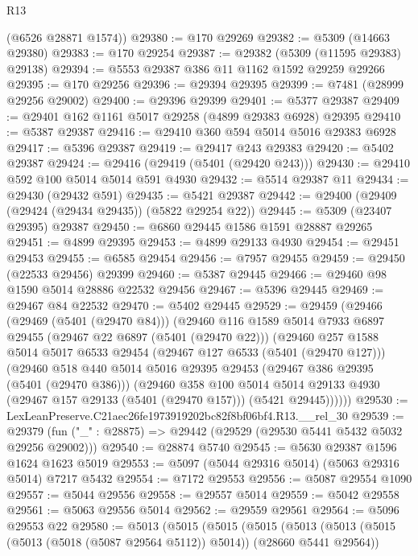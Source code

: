 \begin{lexlean}{R13}
\begin{coremodule}
      (@6526 @28871 @1574))
@29380 := @170 @29269
@29382 := @5309 (@14663 @29380)
@29383 := @170 @29254
@29387 := @29382 (@5309 (@11595 @29383) @29138)
@29394 := @5553 @29387 @386 @11 @1162 @1592 @29259 @29266
@29395 := @170 @29256
@29396 := @29394 @29395
@29399 := @7481 (@28999 @29256 @29002)
@29400 := @29396 @29399
@29401 := @5377 @29387
@29409 := @29401 @162 @1161 @5017 @29258 (@4899 @29383 @6928) @29395
@29410 := @5387 @29387
@29416 := @29410 @360 @594 @5014 @5016 @29383 @6928
@29417 := @5396 @29387
@29419 := @29417 @243 @29383
@29420 := @5402 @29387
@29424 := @29416 (@29419 (@5401 (@29420 @243)))
@29430 := @29410 @592 @100 @5014 @5014 @591 @4930
@29432 := @5514 @29387 @11
@29434 := @29430 (@29432 @591)
@29435 := @5421 @29387
@29442 := @29400 (@29409 (@29424 (@29434 @29435)) (@5822 @29254 @22))
@29445 := @5309 (@23407 @29395) @29387
@29450 := @6860 @29445 @1586 @1591 @28887 @29265
@29451 := @4899 @29395
@29453 := @4899 @29133 @4930
@29454 := @29451 @29453
@29455 := @6585 @29454
@29456 := @7957 @29455
@29459 := @29450 (@22533 @29456) @29399
@29460 := @5387 @29445
@29466 := @29460 @98 @1590 @5014 @28886 @22532 @29456
@29467 := @5396 @29445
@29469 := @29467 @84 @22532
@29470 := @5402 @29445
@29529 := @29459
    (@29466
      (@29469 (@5401 (@29470 @84)))
      (@29460
        @116
        @1589
        @5014
        @7933
        @6897
        @29455
        (@29467 @22 @6897 (@5401 (@29470 @22)))
        (@29460
          @257
          @1588
          @5014
          @5017
          @6533
          @29454
          (@29467 @127 @6533 (@5401 (@29470 @127)))
          (@29460
            @518
            @440
            @5014
            @5016
            @29395
            @29453
            (@29467 @386 @29395 (@5401 (@29470 @386)))
            (@29460
              @358
              @100
              @5014
              @5014
              @29133
              @4930
              (@29467 @157 @29133 (@5401 (@29470 @157)))
              (@5421 @29445))))))
@29530 := LexLeanPreserve.C21aec26fe1973919202bc82f8bf06bf4.R13.__rel_30
@29539 := @29379 (fun ("_" : @28875) => @29442 (@29529 (@29530 @5441 @5432 @5032 @29256 @29002)))
@29540 := @28874 @5740
@29545 := @5630 @29387 @1596 @1624 @1623 @5019
@29553 := @5097 (@5044 @29316 @5014) (@5063 @29316 @5014) @7217 @5432
@29554 := @7172 @29553
@29556 := @5087 @29554 @1090
@29557 := @5044 @29556
@29558 := @29557 @5014
@29559 := @5042 @29558
@29561 := @5063 @29556 @5014
@29562 := @29559 @29561
@29564 := @5096 @29553 @22
@29580 := @5013
    (@5015
      (@5015
        (@5015
          (@5013
            (@5013 (@5015 (@5013 (@5018 (@5087 @29564 @5112)) @5014)) (@28660 @5441 @29564))

\end{coremodule}
\end{lexlean}
